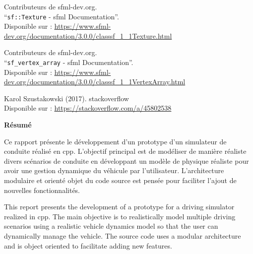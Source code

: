 \documentclass[a4paper,12pt]{report}
\begin{document}
\begin{thebibliography}{9}
        Contributeurs de sfml-dev.org.\\
        ``\texttt{sf::Texture} - \gls{sfml} Documentation''.\\
        Disponible sur : \url{https://www.sfml-dev.org/documentation/3.0.0/classsf_1_1Texture.html}

        Contributeurs de sfml-dev.org.\\
        ``\texttt{\gls{sf_vertex_array}} - \gls{sfml} Documentation''.\\
        Disponible sur : \url{https://www.sfml-dev.org/documentation/3.0.0/classsf_1_1VertexArray.html}

        Karol Szustakowski (2017).
        \gls{stackoverflow} \\
        Disponible sur : \url{https://stackoverflow.com/a/45802538}
    \end{thebibliography}

    \clearpage
    \vspace*{\fill}
    \begin{center}
    {\Large \textbf{Résumé}}
    \end{center}
    \bigskip
    \noindent
    \begin{minipage}{\textwidth}
        Ce rapport présente le développement d'un prototype d'un simulateur de conduite réalisé en \gls{cpp}.
        L'objectif principal est de modéliser de manière réaliste divers scénarios de conduite en développant un modèle de physique réaliste pour avoir une gestion dynamique du véhicule par l'utilisateur.
        L'architecture modulaire et orienté objet du code source est pensée pour faciliter l'ajout de nouvelles fonctionnalités.

        \bigskip

        This report presents the development of a prototype for a driving simulator realized in \gls{cpp}.
        The main objective is to realistically model multiple driving scenarios using a realistic vehicle dynamics model so that the user can dynamically manage the vehicle.
        The source code uses a modular architecture and is object oriented to facilitate adding new features.
    \end{minipage}
    \vspace*{\fill} %
    \clearpage
\end{document}
